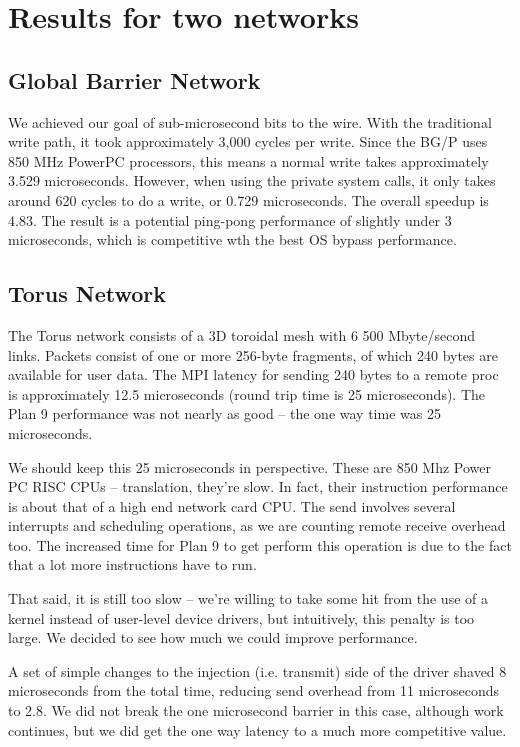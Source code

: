 \documentclass[letterpaper,twocolumn,10pt]{article}
\begin{document}
\section{Results for two networks}
\subsection{Global Barrier Network}
We achieved our goal of sub-microsecond bits to the wire. With the traditional write path, it took approximately 3,000 cycles per write. Since the BG/P uses 850 MHz PowerPC processors, this means a normal write takes approximately 3.529 microseconds. However, when using the private system calls, it only takes around 620 cycles to do a write, or 0.729 microseconds. The overall speedup is 4.83. 
The result is a potential ping-pong performance of slightly under 3 microseconds, which is competitive wth the best OS bypass performance. 

\subsection{Torus Network}
The Torus network consists of a 3D toroidal mesh with 6 500 Mbyte/second links. Packets consist of one or more 
256-byte fragments, of which 240 bytes are available for user data. The MPI latency for sending 240  bytes to a remote 
proc is approximately 12.5 microseconds (round trip time is 25 microseconds). The Plan 9 performance was not nearly as good -- the one way time was 25 microseconds. 

We should keep this 25 microseconds in perspective. These are 850 Mhz Power PC RISC CPUs -- translation, they're slow.
In fact, their instruction performance is about that of a high end network card CPU. The send involves several interrupts and scheduling operations, as we are counting remote receive overhead too. The increased time for Plan 9 
to get perform this operation is due to the fact that a lot more instructions have to run. 

That said, it is still too slow -- we're willing to take some hit from the use of a kernel instead of user-level device drivers, but intuitively, this penalty is too large. We decided to see how much we could improve performance. 

A set of simple changes to the injection (i.e. transmit) side of the driver shaved 8 microseconds from the total time, 
reducing send overhead from 11 microseconds to 2.8. We did not break the one microsecond barrier in this case, although work continues, but we did get the one way latency to a much more competitive value. 
\end{document}
